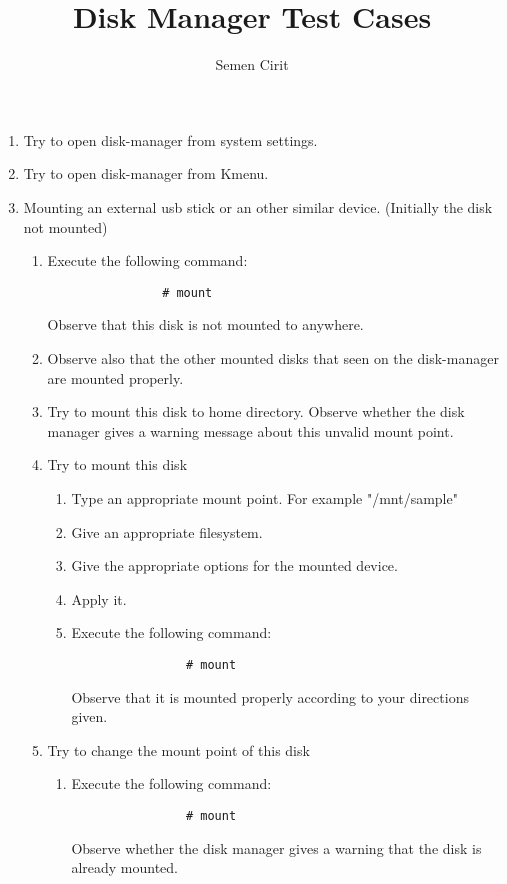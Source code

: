 \documentclass[a4paper,10pt]{article}
\title{Disk Manager Test Cases}
\author{Semen Cirit}
\begin{document}
\maketitle
\begin{enumerate}

\item Try to open disk-manager from system settings.
\item Try to open disk-manager from Kmenu.

\item Mounting an external usb stick or an other similar device. (Initially the disk not mounted) 
    \begin{enumerate}
        \item Execute the following command:
            \begin{verbatim}
                # mount
            \end{verbatim}
            Observe that this disk is not mounted to anywhere. 

	\item Observe also that the other mounted disks that seen on the disk-manager are mounted properly.  

    \item Try to mount this disk to home directory.
          Observe whether the disk manager gives a warning message about this unvalid mount point.
    \item Try to mount this disk
        \begin{enumerate}
            \item Type an appropriate mount point. For example "/mnt/sample"
            \item Give an appropriate filesystem.
            \item Give the appropriate options for the mounted device.
            \item Apply it.
            \item Execute the following command:
            \begin{verbatim}
                # mount
            \end{verbatim}
                Observe that it is mounted properly according to your directions given.
        \end{enumerate}

    \item Try to change the mount point of this disk
        \begin{enumerate}
            \item Execute the following command:
            \begin{verbatim}
                # mount
            \end{verbatim}
            Observe whether the disk manager gives a warning that the disk is already mounted.
        \end{enumerate}


\end{enumerate}
\end{enumerate}
\end{document}
